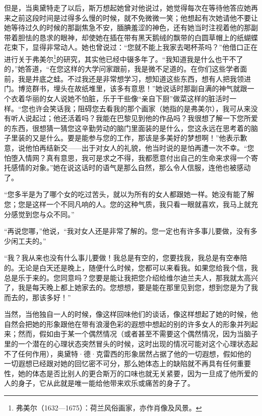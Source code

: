 \par 但是，当奥黛特走了以后，斯万想起她曾对他说过，她觉得每次在等待他答应她再来之前这段时间是过得多么慢的时候，就不免微微一笑；他想起有次她请他不要让她等待过久的时候的那副焦急不安，腼腆羞涩的神色，还有她当时注视着他的那副带着胆怯的恳求的眼神，却使她在插在带有黑天鹅绒的飘带的白圆草帽上的纸蝴蝶花束下，显得非常动人。她也曾说过：“您就不能上我家去喝杯茶吗？”他借口正在进行关于弗美尔\footnote{弗美尔（1632—1675）：荷兰风俗画家，亦作肖像及风景。}的研究，其实他已经中辍多年了。“我知道我是什么也干不了的，”她答道，“在您这样的大学问家跟前，我是微不足道的。在你们这些学者面前，我是井底之蛙。不过我还是非常想学习，想知道这些东西，想有人把我领进门。博览群书，埋头在故纸堆里，该多有意思！”她说话时那副自满的神气就跟一个衣着华丽的女人说她不怕脏，乐于干些像“亲自下厨”做菜这样的脏活时一样。“您也许会笑话我；阻碍您去看我的那个画家（她指的是弗美尔），我可从来没有听人说起过；他还活着吗？我能在巴黎见到他的作品吗？我很想了解一下您所爱的东西，很想猜一猜您这辛勤劳动的脑门里面装的是什么，您这永远在思考着的脑子里装的又是什么。要是能参与您的工作，那该是多美好的梦想啊！”他表示歉意，说他怕再结新交——出于对女人的礼貌，他当时说的是怕再遭一次不幸。“您怕堕入情网？真有意思，我可是求之不得，我都愿意付出自己的生命来求得一个寄托感情的对象。”她在说这话时的语气是那么自然，那么令人信服，连他也被感动了。
\par “您多半是为了哪个女的吃过苦头，就以为所有的女人都跟她一样。她没有能了解您；您是这样一个不同凡响的人。您的这种气质，我只看一眼就喜欢，我马上就充分感觉到您与众不同。”
\par “再说您哪，”他说，“我对女人还是非常了解的。您一定也有许多事儿要做，没有多少闲工夫的。”
\par “我？我从来也没有什么事儿要做！我总是有空的，您要找我，我总是有空奉陪的。无论是白天还是晚上，随便什么时候，您都可以来看我。如果您给我个信，我总是乐于来的。您同意吗？您要是能让我把您介绍给维尔迪兰夫人，那我就太高兴了，我是每天晚上都上她家去的。您想想，要是能在那里见到您，想到您是为了我而去的，那该多好！”
\par 当然，当他独自一人的时候，像这样回味他们的谈话，像这样想起了她的时候，他自然会把她的形象跟他在带有浪漫色彩的遐想中想起的别的许多女人的形象并列起来；然而，假如由于某一个偶然情况（或者甚至不需要这个偶然情况，因为当脑子里的一个潜在的心理状态突然冒头的时候，这时出现的情况可能对这个心理状态起不了任何作用），奥黛特·德·克雷西的形象居然占据了他的一切遐想，假如他的一切遐想已经跟对她的回忆密不可分，那么她体态上的缺陷就不再具有任何重要性，她的体态是否比别人的更合斯万的口味也就无关紧要，因为一旦成了他所爱的人的身子，它从此就是唯一能给他带来欢乐或痛苦的身子了。
